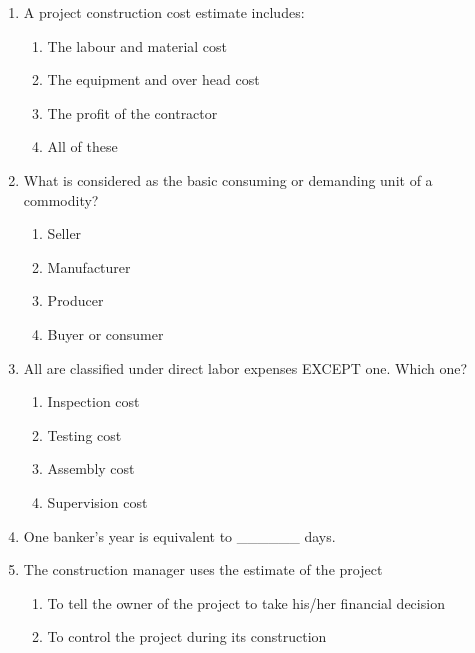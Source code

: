 \documentclass[11pt,a4paper]{article}
\begin{document}
\begin{enumerate}
\item{A project construction cost estimate includes:}
\begin{enumerate}[label=\Alph*.]
\item{The labour and material cost}
\item{The equipment and over head cost}
\item{The profit of the contractor}
\item{All of these}
\end{enumerate}
\item{What is considered as the basic consuming or demanding unit of a commodity?}
\begin{enumerate}[label=\Alph*.]
\item{Seller}
\item{Manufacturer}
\item{Producer}
\item{Buyer or consumer}
\end{enumerate}
\item{All are classified under direct labor expenses EXCEPT one. Which one?}
\begin{enumerate}[label=\Alph*.]
\item{Inspection cost}
\item{Testing cost}
\item{Assembly cost}
\item{Supervision cost}
\end{enumerate}
\item{One banker's year is equivalent to \_\_\_\_\_\_ days.
}
\\
\item{The construction manager uses the estimate of the project}
\begin{enumerate}[label=\Alph*.]
\item{To tell the owner of the project to take his/her financial decision}
\item{To control the project during its construction}

\end{enumerate}
\end{enumerate}
\end{document}
